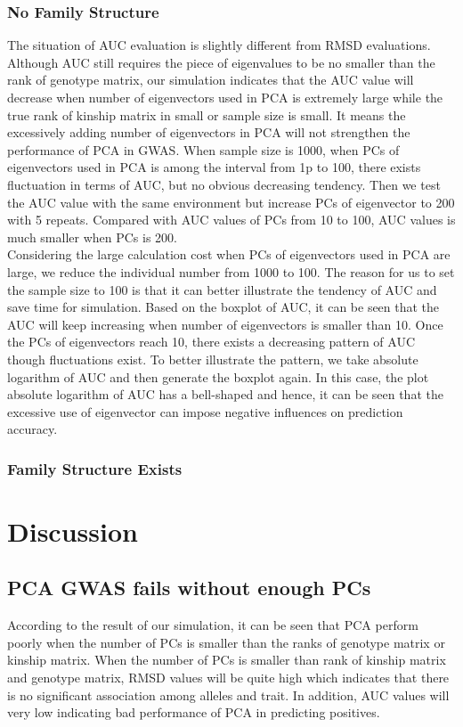 \documentclass[12pt]{article}
\theoremstyle{definition}
\theoremstyle{plain}
\begin{document}
\subsubsection{No Family Structure}
The situation of AUC evaluation is slightly different from RMSD evaluations. Although AUC still requires the piece of eigenvalues to be no smaller than the rank of genotype matrix, our simulation indicates that the AUC value will decrease when number of eigenvectors used in PCA is extremely large while the true rank of kinship matrix in small or sample size is small. It means the excessively adding number of eigenvectors in PCA will not strengthen the performance of PCA in GWAS.
When sample size is 1000, when PCs of eigenvectors used in PCA is among the interval from 1p to 100, there exists fluctuation in terms of AUC, but no obvious decreasing tendency. Then we test the AUC value with the same environment but increase PCs of eigenvector to 200 with 5 repeats. Compared with AUC values of PCs from 10 to 100, AUC values is much smaller when PCs is 200.\\
 Considering the large calculation cost when PCs of eigenvectors used in PCA are large, we reduce the individual number from 1000 to 100. The reason for us to set the sample size to 100 is that it can better illustrate the tendency of AUC and save time for simulation. Based on the boxplot of AUC, it can be seen that the AUC will keep increasing when number of eigenvectors is smaller than 10. Once the PCs of eigenvectors reach 10, there exists a decreasing pattern of AUC though fluctuations exist. To better illustrate the pattern, we take absolute logarithm of AUC and then generate the boxplot again. In this case, the plot absolute logarithm of AUC has a bell-shaped and hence, it can be seen that the excessive use of eigenvector can impose negative influences on prediction accuracy.\\
 \subsubsection{Family Structure Exists}


\section{Discussion}
\subsection{PCA GWAS fails without enough PCs}
According to the result of our simulation, it can be seen that PCA perform poorly when the number of PCs is smaller than the ranks of genotype matrix or kinship matrix. When the number of PCs is smaller than rank of kinship matrix and genotype matrix, RMSD values will be quite high which indicates that there is no significant association among alleles and trait. In addition, AUC values will very low indicating bad performance of PCA in predicting positives. 
\end{document}
